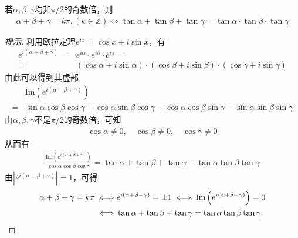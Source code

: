 \begin{theorem}\label{th:tan-x+y+z=k.pi}
  若$\alpha, \beta, \gamma$均非$\pi/2$的奇数倍，则
  \begin{align*}
    \alpha+\beta+\gamma = k\pi,(k\in\mathbb{Z}) \iff
    \tan\alpha +\tan\beta+\tan\gamma=\tan\alpha \cdot \tan\beta \cdot \tan\gamma
  \end{align*}
\end{theorem}
\begin{proof}[提示]
  利用欧拉定理$e^{ix} = \cos x + i \sin x$，有
  \begin{align*}
    e^{i(\alpha + \beta + \gamma)} ={}& e^{i\alpha}\cdot e^{i\beta}\cdot e^{i\gamma} =\\
    ={}& (\cos\alpha + i\sin\alpha) \cdot (\cos\beta + i\sin\beta) \cdot (\cos\gamma + i\sin\gamma)
  \end{align*}
  由此可以得到其虚部
  \begin{align*}
    &\mathrm{Im}\left(e^{i(\alpha + \beta + \gamma)}\right) \\
    ={}& \sin\alpha\cos\beta\cos\gamma + \cos\alpha\sin\beta\cos\gamma + \cos\alpha\cos\beta\sin\gamma - \sin\alpha\sin\beta\sin\gamma
  \end{align*}
  由$\alpha,\beta,\gamma$不是$\pi/2$的奇数倍，可知
  \begin{align*}
    \cos\alpha\ne0,\quad \cos\beta\ne0,\quad \cos\gamma\ne0
  \end{align*}
  从而有
  \begin{align*}
    \frac{\mathrm{Im}\left(e^{i(\alpha + \beta + \gamma)}\right)}{\cos\alpha\cos\beta\cos\gamma}
    = \tan\alpha + \tan\beta + \tan\gamma - \tan\alpha\tan\beta\tan\gamma
  \end{align*}
  由$\left| e^{i(\alpha + \beta + \gamma)} \right| = 1$，可得
  \begin{align*}
    \alpha + \beta + \gamma = k\pi \iff &
    e^{i(\alpha + \beta + \gamma)} = \pm 1 
    \iff \mathrm{Im}\left(e^{i(\alpha + \beta + \gamma)}\right) = 0\\
    \iff & \tan\alpha + \tan\beta + \tan\gamma = \tan\alpha\tan\beta\tan\gamma\qedhere
  \end{align*}


\end{proof}


